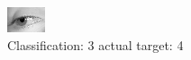 \begin{figure}[h!]
\begin{center}
\includegraphics[width=0.60\columnwidth]{figures/ID2958_class_3_target_4.png}
\end{center}
\caption{ Classification: 3 actual target: 4}
\label{fig:ID2958_class_3_target_4}
\end{figure}
